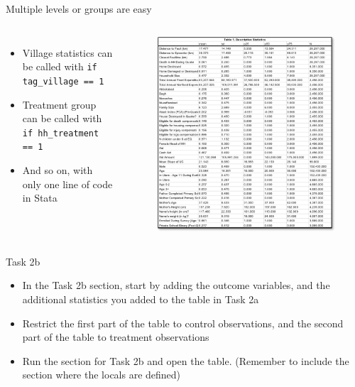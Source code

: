 \documentclass[aspectratio=169]{beamer}
\begin{document}
\begin{frame}[fragile]{Multiple levels or groups are easy}
	\begin{columns}[c]	
		\begin{itemize}
			\item Village statistics can be called with \texttt{if tag\_village == 1}
			\item Treatment group can be called with \texttt{if hh\_treatment == 1}
			\item And so on, with only one line of code in Stata
		\end{itemize}
		\begin{figure}
			\centering
			\includegraphics[width=\linewidth]{img/table1}
		\end{figure}
	\end{columns}
\end{frame}


\begin{frame}{Task 2b}
	\begin{itemize}
		\item In the Task 2b section, start by adding the outcome variables, and the additional statistics you added to the table in Task 2a
		\item Restrict the first part of the table to control observations, and the second part of the table to treatment observations
		\item Run the section for Task 2b and open the table. (Remember to include the section where the locals are defined)
	\end{itemize}
\end{frame}
\end{document}
